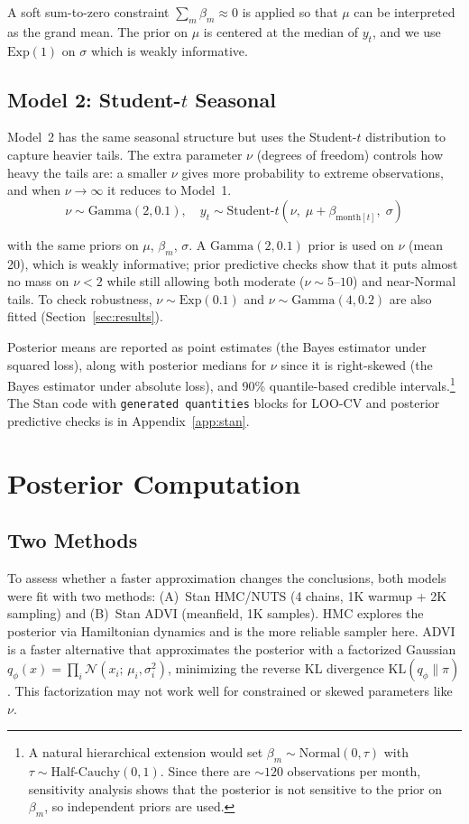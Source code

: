 \documentclass[10pt]{article}
\begin{document}
\noindent A soft sum-to-zero constraint $\sum_m \beta_m \approx 0$ is applied so that $\mu$ can be interpreted as the grand mean. The prior on $\mu$ is centered at the median of $y_t$, and we use $\text{Exp}(1)$ on $\sigma$ which is weakly informative.

\subsection{Model 2: Student-$t$ Seasonal}
Model~2 has the same seasonal structure but uses the Student-$t$ distribution to capture heavier tails. The extra parameter $\nu$ (degrees of freedom) controls how heavy the tails are: a smaller $\nu$ gives more probability to extreme observations, and when $\nu \to \infty$ it reduces to Model~1.
\vspace{-0.3em}
\[
\nu \sim \text{Gamma}(2, 0.1), \quad y_t \sim \text{Student-}t(\nu,\; \mu + \beta_{\text{month}[t]},\; \sigma)
\]
\vspace{-0.6em}

\noindent with the same priors on $\mu$, $\beta_m$, $\sigma$. A $\text{Gamma}(2, 0.1)$ prior is used on $\nu$ (mean 20), which is weakly informative; prior predictive checks show that it puts almost no mass on $\nu < 2$ while still allowing both moderate ($\nu \sim 5$--$10$) and near-Normal tails. To check robustness, $\nu \sim \text{Exp}(0.1)$ and $\nu \sim \text{Gamma}(4, 0.2)$ are also fitted (Section~\ref{sec:results}).

Posterior means are reported as point estimates (the Bayes estimator under squared loss), along with posterior medians for $\nu$ since it is right-skewed (the Bayes estimator under absolute loss), and 90\% quantile-based credible intervals.\footnote{A natural hierarchical extension would set $\beta_m \sim \text{Normal}(0, \tau)$ with $\tau \sim \text{Half-Cauchy}(0, 1)$. Since there are ${\sim}120$ observations per month, sensitivity analysis shows that the posterior is not sensitive to the prior on $\beta_m$, so independent priors are used.} The Stan code with \texttt{generated quantities} blocks for LOO-CV and posterior predictive checks is in Appendix~\ref{app:stan}.



\section{Posterior Computation}

\subsection{Two Methods}
To assess whether a faster approximation changes the conclusions, both models were fit with two methods: (A)~Stan HMC/NUTS (4 chains, 1K warmup + 2K sampling) and (B)~Stan ADVI (meanfield, 1K samples). HMC explores the posterior via Hamiltonian dynamics and is the more reliable sampler here. ADVI is a faster alternative that approximates the posterior with a factorized Gaussian $q_\phi(x) = \prod_i \mathcal{N}(x_i;\, \mu_i, \sigma_i^2)$, minimizing the reverse KL divergence $\text{KL}(q_\phi \| \pi)$. This factorization may not work well for constrained or skewed parameters like $\nu$.
\end{document}
